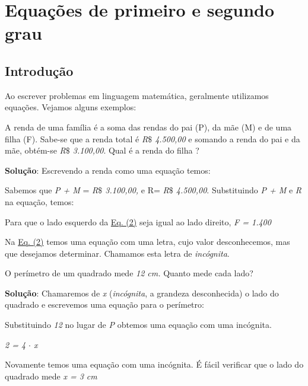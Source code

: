 \chapter{Equações de primeiro e segundo grau}

\section{Introdução}

Ao escrever problemas em linguagem matemática, geralmente utilizamos equações. Vejamos alguns exemplos:

\begin{texemplo}
A renda de uma família é a soma das rendas do pai (P), da mãe (M) e de uma filha (F). Sabe-se que a renda total é \textit{R$\$$  4.500,00} e somando a renda do pai e da mãe, obtém-se \textit{R$\$$  3.100,00}. Qual é a renda do filha ?

\textbf{Solução}: Escrevendo a renda como uma equação temos:


Sabemos que \textit{P + M} = \textit{R$\$$  3.100,00, }e R=\textit{ R$\$$  4.500,00}. Substituindo \textit{ P + M } e \textit{R} na equação, temos:


Para que o lado esquerdo da \hyperref[eqc:4.2]{Eq. (2)} seja igual ao lado direito, \textit{F = 1.400 }\qedsymbol{}
\end{texemplo}

\begin{justify}
Na \hyperref[eqc:4.2]{Eq. (2)} temos uma equação com uma letra, cujo valor desconhecemos, mas que desejamos determinar. Chamamos esta letra de \textit{incógnita}.
\end{justify}

\begin{texemplo}
O perímetro de um quadrado mede \textit{12 cm. }Quanto mede cada lado?

\textbf{Solução}: Chamaremos de \textit{x} (\textit{incógnita}, a grandeza desconhecida) o lado do quadrado e escrevemos uma equação para o perímetro:


Substituindo \textit{12} no lugar de \textit{P} obtemos uma equação com uma incógnita.

\textit{2 = 4 $ \cdot $  x}

Novamente temos uma equação com uma incógnita. É fácil verificar que o lado do quadrado mede \textit{x = 3 cm} \qedsymbol{}

\end{texemplo}

